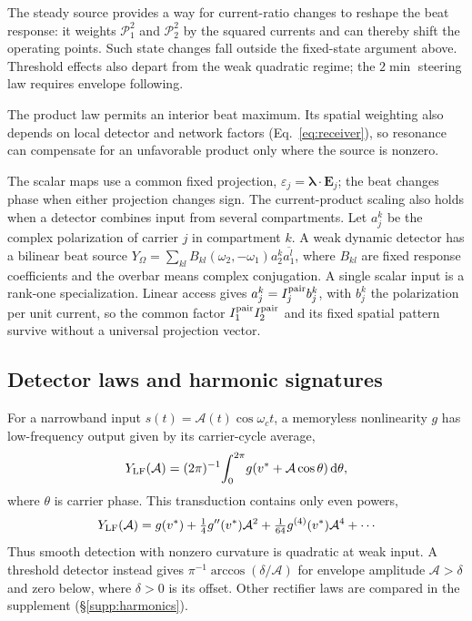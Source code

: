 The steady source provides a way for current-ratio changes to reshape the
beat response: it weights $\mathcal P_1^2$ and $\mathcal P_2^2$ by the squared
currents and can thereby shift the operating points. Such state changes fall
outside the fixed-state argument above. Threshold effects also depart from
the weak quadratic regime; the $2\min$ steering law requires envelope following.

The product law permits an interior beat maximum. Its spatial weighting also
depends on local detector and network factors (Eq.~\eqref{eq:receiver}), so
resonance can compensate for an unfavorable product only where the source
is nonzero.

The scalar maps use a common fixed projection,
$\varepsilon_j=\boldsymbol\lambda\cdot\mathbf E_j$; the beat changes phase
when either projection changes sign. The current-product scaling also holds
when a detector combines input from several compartments. Let $a_j^k$ be the
complex polarization of carrier $j$ in compartment $k$. A weak dynamic
detector has a bilinear beat source
$Y_\Omega=\sum_{kl}B_{kl}(\omega_2,-\omega_1)a_2^k\overline{a_1^l}$,
where $B_{kl}$ are fixed response coefficients and the overbar means complex
conjugation. A single scalar input is a rank-one specialization. Linear
access gives $a_j^k=I_j^{\rm pair}b_j^k$, with $b_j^k$ the polarization per
unit current, so the common factor $I_1^{\rm pair}I_2^{\rm pair}$ and its
fixed spatial pattern survive without a universal projection vector.

\subsection{Detector laws and harmonic signatures}\label{sec:transduction}
For a narrowband input $s(t)=\mathcal A(t)\cos\omega_c t$, a memoryless
nonlinearity $g$ has low-frequency output given by its carrier-cycle average,
\[
Y_{\rm LF}(\mathcal A)=(2\pi)^{-1}\!\int_0^{2\pi}\!g(v^*+\mathcal A\cos\theta)\,\mathrm{d}\theta,
\]
where $\theta$ is carrier phase. This transduction contains
only even powers,
\begin{equation}
Y_{\rm LF}(\mathcal A)=g(v^*)+\tfrac14 g''(v^*)\mathcal A^2+\tfrac1{64}g^{(4)}(v^*)\mathcal A^4+\cdots
\label{eq:cycavg}
\end{equation}
Thus smooth detection with nonzero curvature is quadratic at weak input.
A threshold detector instead gives
$\pi^{-1}\arccos(\delta/\mathcal A)$ for envelope amplitude
$\mathcal A>\delta$ and zero below, where $\delta>0$ is its offset.
Other rectifier laws are compared in the supplement (\S\ref{supp:harmonics}).

